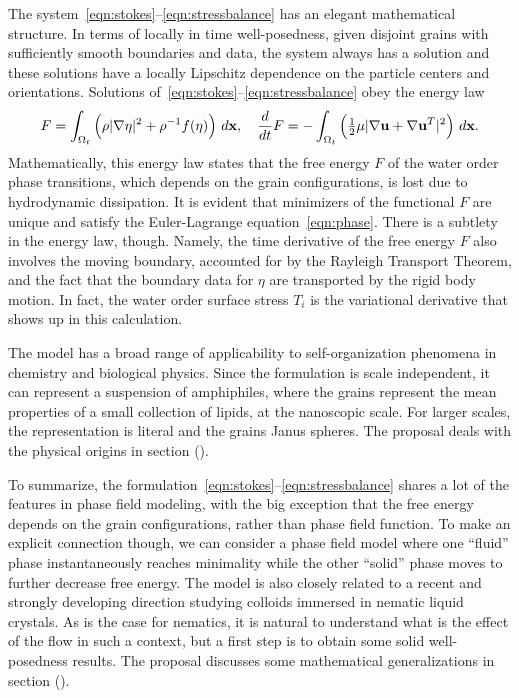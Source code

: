 The system~\eqref{eqn:stokes}--\eqref{eqn:stressbalance} has an elegant
mathematical structure. In terms of locally in time well-posedness,
given disjoint grains with sufficiently smooth boundaries and data, the
system always has a solution and these solutions have a locally
Lipschitz dependence on the particle centers and orientations.
Solutions of~\eqref{eqn:stokes}--\eqref{eqn:stressbalance} obey the
energy law
\begin{align}
  F = \int_{\Omega_t}
  \left(\rho |\nabla \eta|^2 + \rho^{-1} f(\eta)\right) \,d\mathbf{x},
  \quad
  \frac{d}{dt}F
  = - \int_{\Omega_t} \left(\tfrac{1}{2}\mu|\nabla \mathbf{u} + \nabla
  \mathbf{u}^T|^2\right) \,d\mathbf{x}.
\end{align}
Mathematically, this energy law states that the free energy $F$ of the
water order phase transitions, which depends on the grain
configurations, is lost due to hydrodynamic dissipation. It is evident
that minimizers of the functional $F$ are unique and satisfy the
Euler-Lagrange equation~\eqref{eqn:phase}. There is a subtlety in the
energy law, though. Namely, the time derivative of the free energy $F$
also involves the moving boundary, accounted for by the Rayleigh
Transport Theorem, and the fact that the boundary data for $\eta$ are
transported by the rigid body motion. In fact, the water order surface
stress $T_i$ is the variational derivative that shows up in this
calculation.

The model has a broad range of applicability to self-organization
phenomena in chemistry and biological physics. Since the formulation is
scale independent, it can represent a suspension of amphiphiles, where
the grains represent the mean properties of a small collection of
lipids, at the nanoscopic scale. For larger scales, the representation
is literal and the grains Janus spheres. The proposal deals with the
physical origins in section (). 

To summarize, the
formulation~\eqref{eqn:stokes}--\eqref{eqn:stressbalance} shares a lot
of the features in phase field modeling, with the big exception that the
free energy depends on the grain configurations, rather than phase field
function. To make an explicit connection though, we can consider a phase
field model where one ``fluid'' phase instantaneously reaches minimality
while the other ``solid'' phase moves to further decrease free energy.
The model is also closely related to a recent and strongly developing
direction studying colloids immersed in nematic liquid crystals. As is
the case for nematics, it is natural to understand what is the effect of
the flow in such a context, but a first step is to obtain some solid
well-posedness results. The proposal discusses some mathematical
generalizations in section ().


